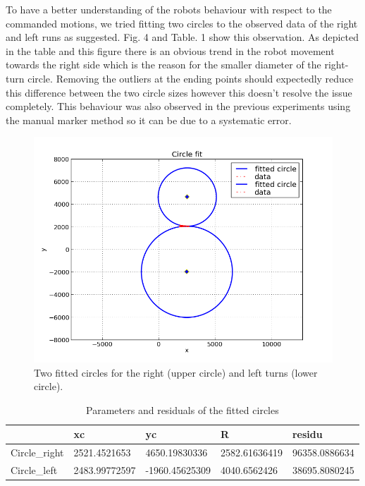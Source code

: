 \documentclass{scrartcl}
\begin{document}
To have a better understanding of the robots behaviour with respect to the commanded motions, we tried fitting two circles to the observed data of the right and left runs as suggested. Fig. 4 and Table. 1 show this observation. As depicted in the table and this figure there is an obvious trend in the robot movement towards the right side which is the reason for the smaller diameter of the right-turn circle. Removing the outliers at the ending points should expectedly reduce this difference between the two circle sizes however this doesn't resolve the issue completely. This behaviour was also observed in the previous experiments using the manual marker method so it can be due to a systematic error.\\


\begin{figure}[H]
\centering
\begin{minipage}{.5\textwidth}
  \centering
  \includegraphics[width=1\linewidth]{img_second_run/Circle_fit.png}
\end{minipage}%

\caption{Two fitted circles for the right (upper circle) and left turns (lower circle). }
\label{fig:circles}
\end{figure}



\begin{table}[h]
\begin{tabular}{|l|l|l|l|l|}
\hline
              & xc            & yc             & R             & residu        \\ \hline
Circle\_right & 2521.4521653  & 4650.19830336  & 2582.61636419 & 96358.0886634 \\ \hline
Circle\_left  & 2483.99772597 & -1960.45625309 & 4040.6562426  & 38695.8080245 \\ \hline
\end{tabular}
\caption{Parameters and residuals of the fitted circles}
\label{my-label}
\end{table}
\end{document}
